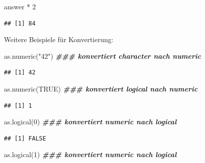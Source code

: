 \documentclass[
]{book}
\newenvironment{Shaded}{\begin{snugshade}}{\end{snugshade}}
\newcommand{\ConstantTok}[1]{\textcolor[rgb]{0.00,0.00,0.00}{#1}}
\newcommand{\DecValTok}[1]{\textcolor[rgb]{0.00,0.00,0.81}{#1}}
\newcommand{\DocumentationTok}[1]{\textcolor[rgb]{0.56,0.35,0.01}{\textbf{\textit{#1}}}}
\newcommand{\FunctionTok}[1]{\textcolor[rgb]{0.00,0.00,0.00}{#1}}
\newcommand{\NormalTok}[1]{#1}
\newcommand{\SpecialCharTok}[1]{\textcolor[rgb]{0.00,0.00,0.00}{#1}}
\newcommand{\StringTok}[1]{\textcolor[rgb]{0.31,0.60,0.02}{#1}}
\begin{document}
\begin{Shaded}
\begin{Highlighting}[]
\NormalTok{answer }\SpecialCharTok{*} \DecValTok{2}
\end{Highlighting}
\end{Shaded}

\begin{verbatim}
## [1] 84
\end{verbatim}

Weitere Beispiele für Konvertierung:

\begin{Shaded}
\begin{Highlighting}[]
\FunctionTok{as.numeric}\NormalTok{(}\StringTok{"42"}\NormalTok{) }\DocumentationTok{\#\#\# konvertiert character nach numeric}
\end{Highlighting}
\end{Shaded}

\begin{verbatim}
## [1] 42
\end{verbatim}

\begin{Shaded}
\begin{Highlighting}[]
\FunctionTok{as.numeric}\NormalTok{(}\ConstantTok{TRUE}\NormalTok{) }\DocumentationTok{\#\#\# konvertiert logical nach numeric}
\end{Highlighting}
\end{Shaded}

\begin{verbatim}
## [1] 1
\end{verbatim}

\begin{Shaded}
\begin{Highlighting}[]
\FunctionTok{as.logical}\NormalTok{(}\DecValTok{0}\NormalTok{)  }\DocumentationTok{\#\#\# konvertiert numeric nach logical}
\end{Highlighting}
\end{Shaded}

\begin{verbatim}
## [1] FALSE
\end{verbatim}

\begin{Shaded}
\begin{Highlighting}[]
\FunctionTok{as.logical}\NormalTok{(}\DecValTok{1}\NormalTok{)  }\DocumentationTok{\#\#\# konvertiert numeric nach logical }
\end{Highlighting}
\end{Shaded}
\end{document}
